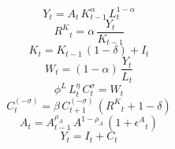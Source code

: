 \noindent[name= `Función de producción']
\begin{dmath}
{Y}_{t}={A}_{t}\, {K}_{t-1}^{{\alpha}}\, {L}_{t}^{1-{\alpha}}
\end{dmath}
\noindent[name= `Demanda de capital']
\begin{dmath}
{R^{K}}_{t}={\alpha}\, \frac{{Y}_{t}}{{K}_{t-1}}
\end{dmath}
\noindent[name= `Ley de acumulación de capital']
\begin{dmath}
{K}_{t}={K}_{t-1}\, \left(1-{\delta}\right)+{I}_{t}
\end{dmath}
\noindent[name= `Demanda de trabajo']
\begin{dmath}
{W}_{t}=\left(1-{\alpha}\right)\, \frac{{Y}_{t}}{{L}_{t}}
\end{dmath}
\noindent[name= `Oferta de trabajo']
\begin{dmath}
{\phi^{L}}\, {L}_{t}^{{\eta}}\, {C}_{t}^{{\sigma}}={W}_{t}
\end{dmath}
\noindent[name= `Ecuación de Euler']
\begin{dmath}
{C}_{t}^{\left(-{\sigma}\right)}={\beta}\, {C}_{t+1}^{\left(-{\sigma}\right)}\, \left({R^{K}}_{t}+1-{\delta}\right)
\end{dmath}
\noindent[name= `Productividad']
\begin{dmath}
{A}_{t}={A}_{t-1}^{{\rho_{A}}}\, {A}^{1-{\rho_{A}}}\, \left(1+{\epsilon^{A}}_{t}\right)
\end{dmath}
\noindent[name= `Demanda agregada']
\begin{dmath}
{Y}_{t}={I}_{t}+{C}_{t}
\end{dmath}
